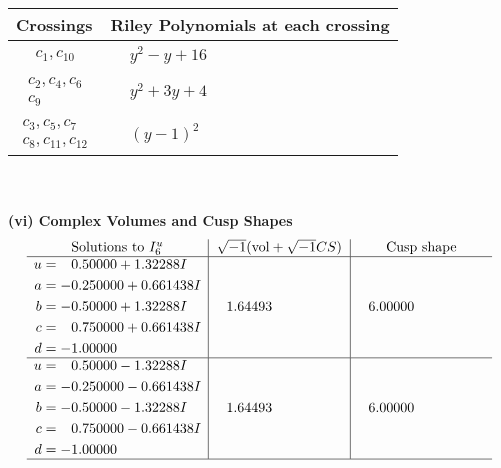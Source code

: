 \documentclass[1p]{elsarticle_modified}
\theoremstyle{definition}
\newcommand{\I}{\sqrt{-1}}
\begin{document}
\begin{tabular}{m{50pt}|m{274pt}}
Crossings & \hspace{64pt}Riley Polynomials at each crossing \\
\hline $$\begin{aligned}c_{1},c_{10}\end{aligned}$$&$\begin{aligned}
&y^2- y+16
\end{aligned}$\\
\hline $$\begin{aligned}c_{2},c_{4},c_{6}\\c_{9}\end{aligned}$$&$\begin{aligned}
&y^2+3 y+4
\end{aligned}$\\
\hline $$\begin{aligned}c_{3},c_{5},c_{7}\\c_{8},c_{11},c_{12}\end{aligned}$$&$\begin{aligned}
&(y-1)^2
\end{aligned}$\\
\hline
\end{tabular}\\~\\
\newpage\flushleft \textbf{(vi) Complex Volumes and Cusp Shapes}
$$\begin{array}{c|c|c}  
\text{Solutions to }I^u_{6}& \I (\text{vol} + \sqrt{-1}CS) & \text{Cusp shape}\\
 \hline 
\begin{aligned}
u &= \phantom{-}0.50000 + 1.32288 I \\
a &= -0.250000 + 0.661438 I \\
b &= -0.50000 + 1.32288 I \\
c &= \phantom{-}0.750000 + 0.661438 I \\
d &= -1.00000\phantom{ +0.000000I}\end{aligned}
 & \phantom{-}1.64493\phantom{ +0.000000I} & \phantom{-}6.00000\phantom{ +0.000000I} \\ \hline\begin{aligned}
u &= \phantom{-}0.50000 - 1.32288 I \\
a &= -0.250000 - 0.661438 I \\
b &= -0.50000 - 1.32288 I \\
c &= \phantom{-}0.750000 - 0.661438 I \\
d &= -1.00000\phantom{ +0.000000I}\end{aligned}
 & \phantom{-}1.64493\phantom{ +0.000000I} & \phantom{-}6.00000\phantom{ +0.000000I}\\
 \hline 
 \end{array}$$\newpage\newpage\renewcommand{\arraystretch}{1}
\end{document}
